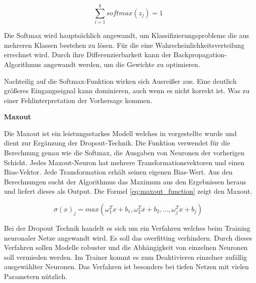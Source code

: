 \begin{equation}\label{eq:softmax_result}
	\sum_{i=1}^{k} softmax(z_{j}) = 1
\end{equation}

Die Softmax wird hauptsächlich angewandt, um Klassifizierungsprobleme die aus mehreren Klassen bestehen zu lösen. Für die eine Wahrscheinlichkeitsverteilung errechnet wird. Durch ihre Differenzierbarkeit kann der Backpropagation-Algorithmus angewandt werden, um die Gewichte zu optimieren.\vspace{0.2cm}

Nachteilig auf die Softmax-Funktion wirken sich Ausreißer aus. Eine deutlich größeres Eingangssignal kann dominieren, auch wenn es nicht korrekt ist. Was zu einer Fehlinterpretation der Vorhersage kommen.\vspace{0.2cm}

%
\textbf{Maxout}\vspace{0.2cm}

Die Maxout ist ein leistungsstarkes Modell welches in \cite{goodfellow_maxout_2013} vorgestellte wurde und dient zur Ergänzung der Dropout-Technik. Die Funktion verwendet für die Berechnung genau wie die Softmax, die Ausgaben von Neuronen der vorherigen Schicht. Jedes Maxout-Neuron hat mehrere Transformationsvektoren und einen Bias-Vektor. Jede Transformation erhält seinen eigenen Bias-Wert. Aus den Berechnungen sucht der Algorithmus das Maximum aus den Ergebnissen heraus und liefert dieses als Output. Die Formel \ref{eq:maxout_function} zeigt den Maxout.

\begin{equation}\label{eq:maxout_function}
	\sigma (x)_{j} = max(\omega^T_1 x + b_1, \omega^T_2 x + b_2, ..., \omega^T_j x + b_j)
\end{equation}

Bei der Dropout Technik handelt es sich um ein Verfahren welches beim Training neuronaler Netze angewandt wird. Es soll das \gls{overfitting} verhindern. Durch dieses Verfahren sollen Modelle robuster und die Abhängigkeit von einzelnen Neuronen soll vermieden werden. Im Trainer kommt es zum Deaktivieren einzelner zufällig ausgewählter Neuronen. Das Verfahren ist besonders bei tiefen Netzen mit vielen Parametern nützlich.



